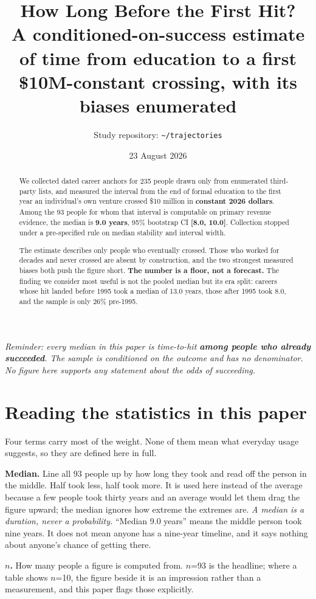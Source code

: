 \documentclass[11pt]{article}
\title{\bfseries How Long Before the First Hit?\\[0.35em]
\large A conditioned-on-success estimate of time from education to a first
\$10M-constant crossing, with its biases enumerated}
\author{\normalsize Study repository: \texttt{\textasciitilde/trajectories}}
\date{\normalsize 23 August 2026}
\newcommand{\floor}{\emph{\small Reminder: every median in this paper is
time-to-hit \textbf{among people who already succeeded}. The sample is
conditioned on the outcome and has no denominator. No figure here supports any
statement about the odds of succeeding.}\par\medskip}
\begin{document}
\maketitle

\begin{abstract}
\noindent We collected dated career anchors for 235 people drawn only from
enumerated third-party lists, and measured the interval from the end of formal
education to the first year an individual's own venture crossed \$10 million in
\textbf{constant 2026 dollars}. Among the 93 people for whom that interval is
computable on primary revenue evidence, the median is \textbf{9.0 years}, 95\%
bootstrap CI \textbf{[8.0, 10.0]}. Collection stopped under a pre-specified rule
on median stability and interval width.

The estimate describes only people who eventually crossed. Those who worked for
decades and never crossed are absent by construction, and the two strongest
measured biases both push the figure short. \textbf{The number is a floor, not a
forecast.} The finding we consider most useful is not the pooled median but its
era split: careers whose hit landed before 1995 took a median of 13.0 years,
those after 1995 took 8.0, and the sample is only 26\% pre-1995.
\end{abstract}

\floor

\section*{Reading the statistics in this paper}

Four terms carry most of the weight. None of them mean what everyday usage
suggests, so they are defined here in full.

\textbf{Median.} Line all 93 people up by how long they took and read off the
person in the middle. Half took less, half took more. It is used here instead of
the average because a few people took thirty years and an average would let them
drag the figure upward; the median ignores how extreme the extremes are.
\emph{A median is a duration, never a probability.} ``Median 9.0 years'' means
the middle person took nine years. It does not mean anyone has a nine-year
timeline, and it says nothing about anyone's chance of getting there.

\textbf{$n$.} How many people a figure is computed from. $n$=93 is the headline;
where a table shows $n$=10, the figure beside it is an impression rather than a
measurement, and this paper flags those explicitly.
\end{document}
